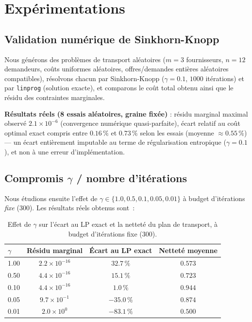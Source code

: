 \documentclass[11pt,a4paper]{article}
\begin{document}
\section{Expérimentations}
\label{sec:experimentations}

\subsection{Validation numérique de Sinkhorn-Knopp}
Nous générons des problèmes de transport aléatoires ($m=3$ fournisseurs, $n=12$ demandeurs, coûts uniformes aléatoires, offres/demandes entières aléatoires compatibles), résolvons chacun par Sinkhorn-Knopp ($\gamma=0.1$, $1000$ itérations) et par \texttt{linprog} (solution exacte), et comparons le coût total obtenu ainsi que le résidu des contraintes marginales.

\textbf{Résultats réels (8 essais aléatoires, graine fixée)} : résidu marginal maximal observé $2.1\times10^{-6}$ (convergence numérique quasi-parfaite), écart relatif au coût optimal exact compris entre $0.16\,\%$ et $0.73\,\%$ selon les essais (moyenne $\approx 0.55\,\%$) --- un écart entièrement imputable au terme de régularisation entropique ($\gamma=0.1$), et non à une erreur d'implémentation.

\subsection{Compromis $\gamma$ / nombre d'itérations}
Nous étudions ensuite l'effet de $\gamma \in \{1.0, 0.5, 0.1, 0.05, 0.01\}$ à budget d'itérations \emph{fixe} ($300$). Les résultats réels obtenus sont~:

\begin{table}[h]
\centering
\caption{Effet de $\gamma$ sur l'écart au LP exact et la \og netteté\fg{} du plan de transport, à budget d'itérations fixe (300).}
\begin{tabular}{lccc}
\toprule
$\gamma$ & Résidu marginal & Écart au LP exact & Netteté moyenne \\
\midrule
1.00 & $2.2\times10^{-16}$ & $32.7\,\%$  & $0.573$ \\
0.50 & $4.4\times10^{-16}$ & $15.1\,\%$  & $0.723$ \\
0.10 & $4.4\times10^{-16}$ & $1.0\,\%$   & $0.944$ \\
0.05 & $9.7\times10^{-1}$  & $-35.0\,\%$ & $0.874$ \\
0.01 & $2.0\times10^{0}$   & $-83.1\,\%$ & $0.500$ \\
\bottomrule
\end{tabular}
\end{table}
\end{document}

